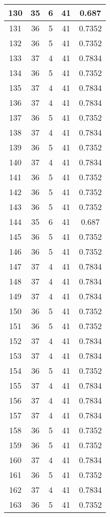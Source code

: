 \documentclass[letterpaper, 12pt]{article}
\begin{document}
\begin{longtable}{|c|c|c|c|c|}
\hline
130 & 35 & 6 & 41 & 0.687 \\
\hline
131 & 36 & 5 & 41 & 0.7352 \\
\hline
132 & 36 & 5 & 41 & 0.7352 \\
\hline
133 & 37 & 4 & 41 & 0.7834 \\
\hline
134 & 36 & 5 & 41 & 0.7352 \\
\hline
135 & 37 & 4 & 41 & 0.7834 \\
\hline
136 & 37 & 4 & 41 & 0.7834 \\
\hline
137 & 36 & 5 & 41 & 0.7352 \\
\hline
138 & 37 & 4 & 41 & 0.7834 \\
\hline
139 & 36 & 5 & 41 & 0.7352 \\
\hline
140 & 37 & 4 & 41 & 0.7834 \\
\hline
141 & 36 & 5 & 41 & 0.7352 \\
\hline
142 & 36 & 5 & 41 & 0.7352 \\
\hline
143 & 36 & 5 & 41 & 0.7352 \\
\hline
144 & 35 & 6 & 41 & 0.687 \\
\hline
145 & 36 & 5 & 41 & 0.7352 \\
\hline
146 & 36 & 5 & 41 & 0.7352 \\
\hline
147 & 37 & 4 & 41 & 0.7834 \\
\hline
148 & 37 & 4 & 41 & 0.7834 \\
\hline
149 & 37 & 4 & 41 & 0.7834 \\
\hline
150 & 36 & 5 & 41 & 0.7352 \\
\hline
151 & 36 & 5 & 41 & 0.7352 \\
\hline
152 & 37 & 4 & 41 & 0.7834 \\
\hline
153 & 37 & 4 & 41 & 0.7834 \\
\hline
154 & 36 & 5 & 41 & 0.7352 \\
\hline
155 & 37 & 4 & 41 & 0.7834 \\
\hline
156 & 37 & 4 & 41 & 0.7834 \\
\hline
157 & 37 & 4 & 41 & 0.7834 \\
\hline
158 & 36 & 5 & 41 & 0.7352 \\
\hline
159 & 36 & 5 & 41 & 0.7352 \\
\hline
160 & 37 & 4 & 41 & 0.7834 \\
\hline
161 & 36 & 5 & 41 & 0.7352 \\
\hline
162 & 37 & 4 & 41 & 0.7834 \\
\hline
163 & 36 & 5 & 41 & 0.7352 \\

\end{longtable}
\end{document}
